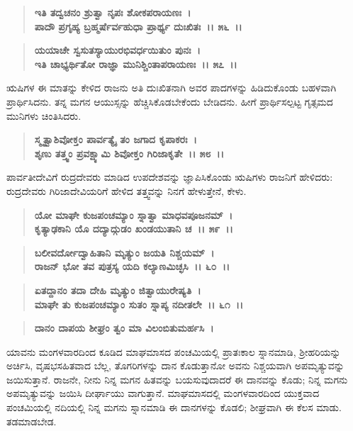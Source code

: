 \begin{verse}
\textbf{ಇತಿ ತದ್ವಚನಂ ಶ್ರುತ್ವಾ ನೃಪಃ ಶೋಕಪರಾಯಣಃ~।}\\\textbf{ಪಾದೌ ಪ್ರಗೃಹ್ಯ ಬ್ರಹ್ಮರ್ಷೆರ್ವಹುಧಾ ಪ್ರಾರ್ಥ್ಯ ದುಃಖಿತಃ~।। ೫೬~।। }
\end{verse}

\begin{verse}
\textbf{ಯಯಾಚೇ ಸ್ವಸುತಸ್ಯಾಯುರಭಿವರ್ಧಯಿತುಂ ಪುನಃ~।}\\\textbf{ಇತಿ ಚಾಭ್ಯರ್ಥಿತೋ ರಾಜ್ಞಾ ಮುನಿಶ್ಚಿಂತಾಪರಾಯಣಃ~।। ೫೭~।।}
\end{verse}

ಋಷಿಗಳ ಈ ಮಾತನ್ನು ಕೇಳಿದ ರಾಜನು ಅತಿ ದುಃಖಿತನಾಗಿ ಅವರ ಪಾದಗಳನ್ನು ಹಿಡಿದುಕೊಂಡು ಬಹಳವಾಗಿ ಪ್ರಾರ್ಥಿಸಿದನು. ತನ್ನ ಮಗನ ಆಯುಸ್ಸನ್ನು ಹೆಚ್ಚಿಸಿಕೊಡಬೇಕೆಂದು ಬೇಡಿದನು. ಹೀಗೆ ಪ್ರಾರ್ಥಿಸಲ್ಪಟ್ಟ ಗೃತ್ಸಮದ ಮುನಿಗಳು ಚಿಂತಿಸಿದರು.

\begin{verse}
\textbf{ಸ್ಮೃತ್ವಾಶಿವೋಕ್ತಂ ಪಾರ್ವತ್ಯೈ ತಂ ಜಗಾದ ಕೃಪಾಕರಃ~।}\\\textbf{ಶೃಣು ತತ್ತ್ವಂ ಪ್ರವಕ್ಷ್ಯಾಮಿ ಶಿವೋಕ್ತಂ ಗಿರಿಜಾಕೃತೇ~।। ೫೮~।।}
\end{verse}

ಪಾರ್ವತೀದೇವಿಗೆ ರುದ್ರದೇವರು ಮಾಡಿದ ಉಪದೇಶವನ್ನು ಜ್ಞಾಪಿಸಿಕೊಂಡು ಋಷಿಗಳು ರಾಜನಿಗೆ ಹೇಳಿದರು: ರುದ್ರದೇವರು ಗಿರಿಜಾದೇವಿಯರಿಗೆ ಹೇಳಿದ ತತ್ತ್ವವನ್ನು ನಿನಗೆ ಹೇಳುತ್ತೇನೆ, ಕೇಳು.

\begin{verse}
\textbf{ಯೋ ಮಾಘೇ ಕುಜಪಂಚಮ್ಯಾಂ ಸ್ನಾತ್ವಾ ಮಾಧವಪೂಜನಮ್~।}\\\textbf{ಕೃತ್ಯಾಢಕಾನಿ ಯೊ ದದ್ಯಾದ್ಗುಡಂ ಖಂಡಯುತಾನಿ ಚ~।। ೫೯~।।} 
\end{verse}

\begin{verse}
\textbf{ಬಲೀವರ್ದೋದ್ವಾಹಿತಾನಿ ಮೃತ್ಯುಂ ಜಯತಿ ನಿಶ್ಚಯಮ್~।}\\\textbf{ರಾಜನ್ ಭೋ ತವ ಪುತ್ರಸ್ಯ ಯದಿ ಕಲ್ಯಾಣಮಿಚ್ಛಸಿ~।। ೬೦~।। }
\end{verse}

\begin{verse}
\textbf{ಏತದ್ದಾನಂ ತದಾ ದೇಹಿ ಮೃತ್ಯುಂ ಜಿತ್ವಾಯುರೇಷ್ಯತಿ~।}\\\textbf{ಮಾಘೇ ತು ಕುಜಪಂಚಮ್ಯಾಂ ಸುತಂ ಸ್ನಾಪ್ಯ ನದೀತಲೇ~।। ೬೧~।। }
\end{verse}

\begin{verse}
\textbf{ದಾನಂ ದಾಪಯ ಶೀಘ್ರಂ ತ್ವಂ ಮಾ ವಿಲಂಬಿತುಮರ್ಹಸಿ~।}
\end{verse}

ಯಾವನು ಮಂಗಳವಾರದಿಂದ ಕೂಡಿದ ಮಾಘಮಾಸದ ಪಂಚಮಿಯಲ್ಲಿ ಪ್ರಾತಃಕಾಲ ಸ್ನಾನಮಾಡಿ, ಶ‍್ರೀಹರಿಯನ್ನು ಅರ್ಚಿಸಿ, ವೃಷಭಸಹಿತವಾದ ಬೆಲ್ಲ, ತೊಗರಿಗಳನ್ನು ದಾನ ಕೊಡುತ್ತಾನೋ ಅವನು ನಿಶ್ಚಯವಾಗಿ ಅಪಮೃತ್ಯುವನ್ನು ಜಯಿಸುತ್ತಾನೆ. ರಾಜನೇ, ನೀನು ನಿನ್ನ ಮಗನ ಹಿತವನ್ನು ಬಯಸುವುದಾದರೆ ಈ ದಾನವನ್ನು ಕೊಡು; ನಿನ್ನ ಮಗನು ಅಪಮೃತ್ಯುವನ್ನು ಜಯಿಸಿ ದೀರ್ಘಾಯು ವಾಗುತ್ತಾನೆ. ಮಾಘಮಾಸದಲ್ಲಿ ಮಂಗಳವಾರದಿಂದ ಯುಕ್ತವಾದ ಪಂಚಮಿಯಲ್ಲಿ ನದಿಯಲ್ಲಿ ನಿನ್ನ ಮಗನು ಸ್ನಾನಮಾಡಿ ಈ ದಾನಗಳನ್ನು ಕೊಡಲಿ; ಶೀಘ್ರವಾಗಿ ಈ ಕೆಲಸ ಮಾಡು. ತಡಮಾಡಬೇಡ.

